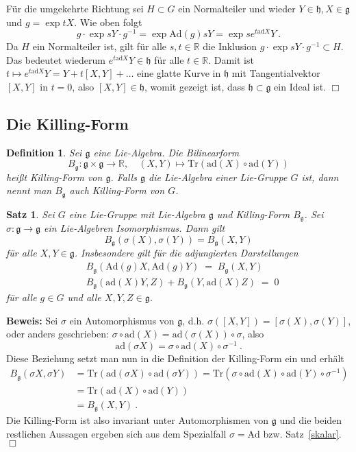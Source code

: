 \documentclass[12pt,a4paper]{article}
\def\R{\mathbb{R}}
\def\Ad{\mathrm{Ad}}
\def\ad{\mathrm{ad}}
\def\Tr{\mathrm{Tr}}
\def\g{\mathfrak{g}}
\def\h{\mathfrak{h}}
\def\ad{\mathrm{ad}}
\newtheorem{Satz}[Lemma]{Satz}
\newtheorem{Definition}[Lemma]{Definition}
\def\proof{\noindent\textbf{Beweis:}\quad}
\def\qed{\quad\hfill\ensuremath{\Box}}
\begin{document}
\medskip

F\"ur die umgekehrte Richtung sei $H\subset G$ ein Normalteiler und wieder
$Y \in \h, X \in \g$ und $g= \exp tX$. Wie oben folgt
$$
g\cdot \exp sY \cdot g^{-1} = \exp \Ad(g) s Y = \exp s e^{t\ad X} Y \ .
$$
Da $H$ ein Normalteiler ist, gilt f\"ur alle $s,t \in \R$ die Inklusion
$g\cdot \exp sY \cdot g^{-1} \subset H$. Das bedeutet wiederum
$e^{t\ad X}Y \in \h$ f\"ur alle $t\in \R$. Damit ist
$t \mapsto e^{t\ad X}Y = Y + t[X, Y] + \ldots $ eine glatte Kurve in
$\h$ mit Tangentialvektor $[X,Y]$ in $t=0$, also $[X,Y]\in \h$, womit
gezeigt ist, dass $\h \subset \g$ ein Ideal ist.
\qed


\bigskip


\subsection{Die Killing-Form}

\bigskip

\begin{Definition}
Sei $\g$ eine Lie-Algebra. Die Bilinearform
$$
B_\g : \g \times \g \rightarrow \R, \quad (X,Y) \mapsto \Tr(\ad(X) \circ  \ad(Y))
$$
hei\ss t {\em Killing-Form} von $\g$. Falls $\g$ die Lie-Algebra einer Lie-Gruppe
$G$ ist, dann nennt man $B_\g$ auch Killing-Form von $G$.
\end{Definition}

\bigskip

\begin{Satz}
Sei $G$ eine Lie-Gruppe mit Lie-Algebra $\g$ und Killing-Form $B_\g$. Sei
$\sigma : \g \rightarrow \g$ ein Lie-Algebren Isomorphismus. Dann gilt
$$
B_\g (\sigma(X), \sigma(Y)) = B_\g(X,Y)
$$
f\"ur alle $X,Y \in \g$. Insbesondere gilt f\"ur die adjungierten Darstellungen
$$
\begin{array}{rl}
& B_\g (\Ad(g)X, \Ad(g)Y) \;=\; B_\g(X,Y)\\[1.5ex]
& B_\g(\ad(X)Y, Z) + B_\g(Y, \ad(X)Z) \;=\; 0
\end{array}
$$
f\"ur alle $g\in G$ und alle $X,Y,Z\in \g$.
\end{Satz}
\proof
Sei $\sigma$ ein Automorphismus von $\g$, d.h. $\sigma ([X,Y])= [\sigma(X), \sigma(Y)]$,
oder anders geschrieben: $\sigma \circ \ad(X) = \ad(\sigma(X))\circ \sigma $, also
$$
\ad(\sigma X ) = \sigma \circ \ad(X) \circ \sigma^{-1} \ .
$$
Diese Beziehung setzt man nun in die Definition der Killing-Form ein und erh\"alt
$$
\begin{array}{rl}
B_\g(\sigma X, \sigma Y) &= \Tr (\ad(\sigma X) \circ \ad (\sigma Y))
= \Tr (\sigma \circ \ad(X) \circ \ad(Y) \circ \sigma^{-1}) \\[1.5ex]
&= \Tr (\ad(X) \circ \ad(Y)) \\[1.5ex]
&= B_\g(X,Y) \ .
\end{array}
$$
Die Killing-Form ist also invariant unter Automorphismen von $\g$ und die
beiden restlichen Aussagen ergeben sich aus dem Spezialfall $\sigma = \Ad$
bzw. Satz~\ref{skalar}.
\qed
\end{document}
